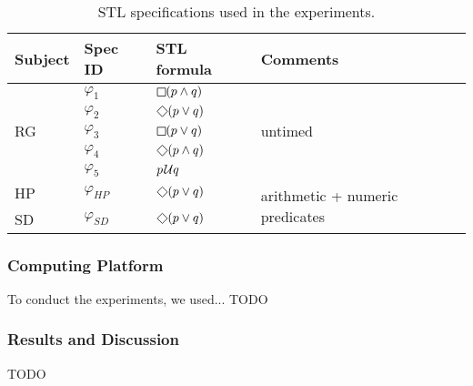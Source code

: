 \begin{table}
\centering
\begin{tabular}{|l|l|l|l|}
\hline
Subject & Spec ID & STL formula & Comments \\
\hline
\multirow{ 5}{*}{RG} & $\varphi_1$ & $\LTLg (p \wedge q)$ & \multirow{ 5}{*}{untimed} \\
& $\varphi_2$ & $\LTLf (p \vee q)$ & \\
& $\varphi_3$ & $\LTLg (p \vee q)$ & \\
& $\varphi_4$ & $\LTLf (p \wedge q)$ & \\
& $\varphi_5$ & $p \kern.1em\mathcal{U} q$ & \\
\hline
HP & $\varphi_{HP}$ & $\LTLf (p \vee q)$ & \multirow{ 2}{*}{arithmetic + numeric predicates} \\
SD & $\varphi_{SD}$ & $\LTLf (p \vee q)$ &  \\
\hline
\end{tabular}
\caption{STL specifications used in the experiments.}
\label{tab:spec} 
\end{table}

\subsubsection{Computing Platform}

To conduct the experiments, we used...
\alert{TODO}
\subsubsection{Results and Discussion}
\alert{TODO}